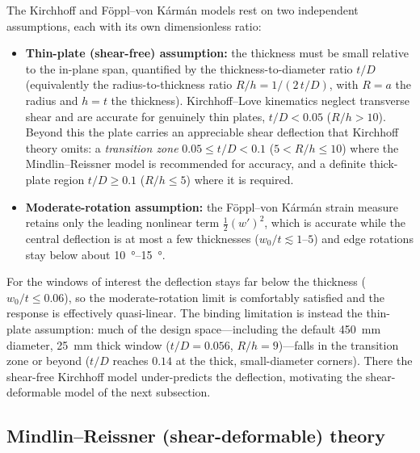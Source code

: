 \documentclass[11pt]{article}
\begin{document}
The Kirchhoff and F\"oppl--von K\'arm\'an models rest on two independent
assumptions, each with its own dimensionless ratio:
%
\begin{itemize}
  \item \textbf{Thin-plate (shear-free) assumption:} the thickness must be small
    relative to the in-plane span, quantified by the thickness-to-diameter ratio
    $t/D$ (equivalently the radius-to-thickness ratio $R/h = 1/(2\,t/D)$, with
    $R=a$ the radius and $h=t$ the thickness). Kirchhoff--Love kinematics neglect
    transverse shear and are accurate for genuinely thin plates,
    $t/D < 0.05$ ($R/h > 10$). Beyond this the plate carries an appreciable shear
    deflection that Kirchhoff theory omits: a \emph{transition zone}
    $0.05 \le t/D < 0.1$ ($5 < R/h \le 10$) where the Mindlin--Reissner model is
    recommended for accuracy, and a definite thick-plate region $t/D \ge 0.1$
    ($R/h \le 5$) where it is required.
  \item \textbf{Moderate-rotation assumption:} the F\"oppl--von K\'arm\'an strain
    measure retains only the leading nonlinear term $\tfrac{1}{2}(w')^{2}$, which
    is accurate while the central deflection is at most a few thicknesses
    ($w_0/t \lesssim 1$--$5$) and edge rotations stay below about \qtyrange{10}{15}{\degree}.
\end{itemize}
%
For the windows of interest the deflection stays far below the thickness
($w_0/t \le 0.06$), so the moderate-rotation limit is comfortably satisfied and
the response is effectively quasi-linear. The binding limitation is instead the
thin-plate assumption: much of the design space---including the default
\qty{450}{\milli\meter} diameter, \qty{25}{\milli\meter} thick window
($t/D = 0.056$, $R/h = 9$)---falls in
the transition zone or beyond ($t/D$ reaches $0.14$ at the thick, small-diameter
corners). There the shear-free Kirchhoff model under-predicts the deflection,
motivating the shear-deformable model of the next subsection.

\subsection{Mindlin--Reissner (shear-deformable) theory}
\label{sec:mindlin}
\end{document}
